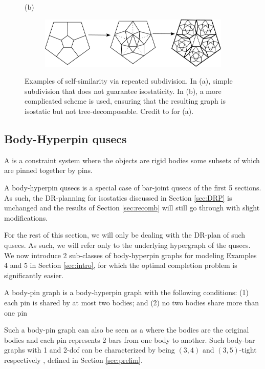 \begin{figure}
    (b)
    \begin{subfigure}{0.8\linewidth}
        \includegraphics[width=\linewidth]{img/pentawesome}
    \end{subfigure}
    \caption{Examples of self-similarity via repeated subdivision. In (a),
    simple subdivision that does not guarantee isostaticity. In (b), a more
complicated scheme is used, ensuring that the resulting graph is isostatic
but not  tree-decomposable. Credit to \cite{subdivision_paper} for (a).}
    \label{fig:subdivision}
\end{figure}

\subsection{Body-Hyperpin qusecs}


\begin{definition}
    A  is a constraint system where the objects are rigid bodies some subsets of which are pinned together by pins.
\end{definition}

\begin{remark}
\label{rem:bodypin_is_barjoint}
    A body-hyperpin qusecs is a special case of bar-joint qusecs of the
    first 5 sections. As such, the DR-planning for isostatics discussed in Section
    \ref{sec:DRP} is unchanged and the results of Section \ref{sec:recomb} will still go through with slight modifications.
\end{remark}

For the rest of this section, we will only be dealing with the DR-plan of
such qusecs. As such, we will refer only to the underlying hypergraph of the qusecs. We now
introduce 2 sub-classes of body-hyperpin graphs for modeling Examples 4 and
5 in Section \ref{sec:intro}, for which the optimal completion problem is
significantly easier.

\begin{definition}
\label{def:body-pin}
    A body-pin graph is a body-hyperpin graph with the following conditions:
    (1) each pin is shared by at most two bodies; and
    (2) no two bodies share more than one pin

    Such a body-pin graph can also be seen as a  where
    the bodies are the original bodies and each pin represents 2 bars from
    one body to another. Such body-bar graphs with 1 and 2-dof can be
    characterized by being $(3,4)$ and $(3,5)$-tight respectively
    \cite{Lee:2007:PGA} \cite{streinu2009sparse},
defined in Section  \ref{sec:prelim}.
\end{definition}

